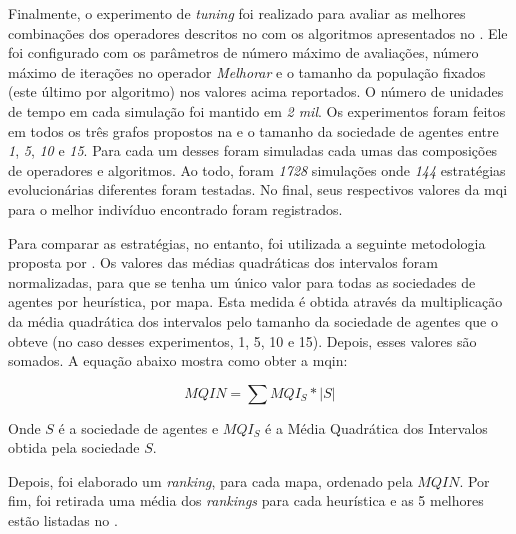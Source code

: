 Finalmente, o experimento de \textit{tuning} foi realizado para avaliar as 
melhores combinações dos operadores descritos no  com 
os algoritmos apresentados no . Ele foi configurado com os 
parâmetros de número máximo de avaliações, número máximo de iterações no 
operador \textit{Melhorar} e o tamanho da população fixados (este último por 
algoritmo) nos valores acima reportados. O número de unidades de tempo em cada 
simulação foi mantido em \textit{2 mil}. Os experimentos foram feitos em todos 
os três grafos propostos na  e o tamanho da sociedade de 
agentes entre \textit{1}, \textit{5}, \textit{10} e \textit{15}. Para cada um 
desses foram simuladas cada umas das composições de operadores e algoritmos. Ao 
todo, foram \textit{1728} simulações onde \textit{144} estratégias 
evolucionárias diferentes foram testadas. No final, seus respectivos valores da 
\ac{mqi} para o melhor indivíduo encontrado foram registrados. 

Para comparar as estratégias, no entanto, foi utilizada a seguinte metodologia 
proposta por \citep{sampaiophd}. Os valores das médias quadráticas dos 
intervalos foram normalizadas, para que se tenha um único valor para todas as 
sociedades de agentes por heurística, por mapa. Esta medida é obtida através da 
multiplicação da média quadrática dos intervalos pelo tamanho da sociedade de 
agentes que o obteve (no caso desses experimentos, 1, 5, 10 e 15). Depois, esses 
valores são somados. A equação abaixo mostra como obter a \ac{mqin}:

$$MQIN = \sum MQI_{S} * |S|$$

Onde $S$ é a sociedade de agentes e $MQI_{S}$ é a Média Quadrática dos 
Intervalos obtida pela sociedade $S$.

Depois, foi elaborado um \textit{ranking}, para cada mapa, ordenado pela $MQIN$. 
Por fim, foi retirada uma média dos \textit{rankings} para cada heurística e as 5 
melhores estão listadas no .

